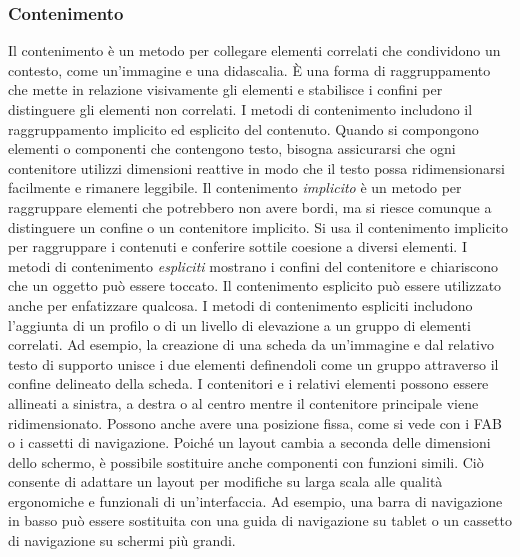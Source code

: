 \documentclass[12pt, a4paper]{report}
\begin{document}
		\subsubsection{Contenimento}
		Il contenimento è un metodo per collegare elementi correlati che condividono un contesto, come un'immagine e una didascalia. È una forma di raggruppamento che mette in relazione visivamente gli elementi e stabilisce i confini per distinguere gli elementi non correlati.
		I metodi di contenimento includono il raggruppamento implicito ed esplicito del contenuto. Quando si compongono elementi o componenti che contengono testo, bisogna assicurarsi che ogni contenitore utilizzi dimensioni reattive in modo che il testo possa ridimensionarsi facilmente e rimanere leggibile.
		Il contenimento \textit{implicito} è un metodo per raggruppare elementi che potrebbero non avere bordi, ma si riesce comunque a distinguere un confine o un contenitore implicito. Si usa il contenimento implicito per raggruppare i contenuti e conferire sottile coesione a diversi elementi.
		I metodi di contenimento \textit{espliciti} mostrano i confini del contenitore e chiariscono che un oggetto può essere toccato. Il contenimento esplicito può essere utilizzato anche per enfatizzare qualcosa. I metodi di contenimento espliciti includono l'aggiunta di un profilo o di un livello di
		elevazione a un gruppo di elementi correlati. Ad esempio, la creazione di una scheda da un'immagine e dal relativo testo di supporto unisce i due elementi definendoli come un gruppo attraverso il confine delineato della scheda.
		I contenitori e i relativi elementi possono essere allineati a sinistra, a destra o al centro mentre il contenitore principale viene ridimensionato. Possono anche avere una posizione fissa, come si vede con i FAB o i cassetti di navigazione.
		Poiché un layout cambia a seconda delle dimensioni dello schermo, è possibile sostituire anche componenti con funzioni simili. Ciò consente di adattare un layout per modifiche su larga scala alle qualità ergonomiche e funzionali di un'interfaccia.
		Ad esempio, una barra di navigazione in basso può essere sostituita con una guida di navigazione su tablet o un cassetto di navigazione su schermi più grandi.
\end{document}
